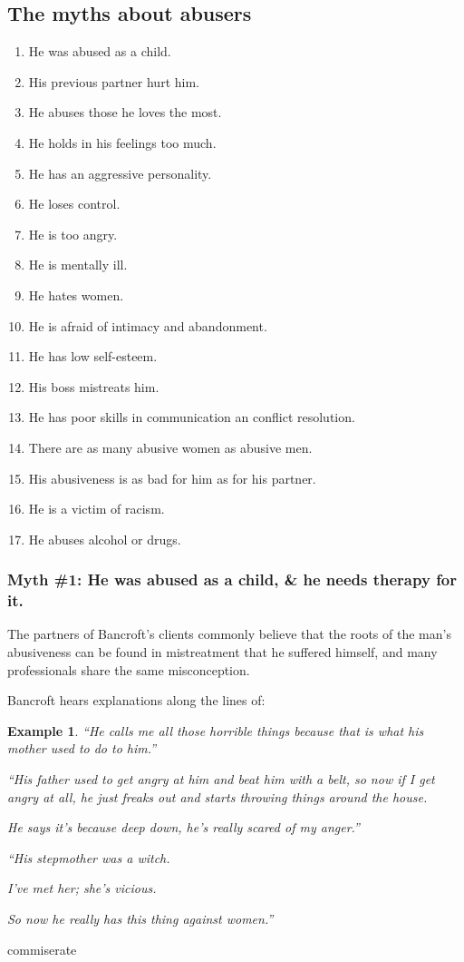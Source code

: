 \documentclass[oneside]{article}
\numberwithin{equation}{section}
\newtheorem{example}{Example}[section]
\begin{document}
\subsection{The myths about abusers}
\begin{enumerate}
    \item He was abused as a child.
    \item His previous partner hurt him.
    \item He abuses those he loves the most.
    \item He holds in his feelings too much.
    \item He has an aggressive personality.
    \item He loses control.
    \item He is too angry.
    \item He is mentally ill.
    \item He hates women.
    \item He is afraid of intimacy and abandonment.
    \item He has low self-esteem.
    \item His boss mistreats him.
    \item He has poor skills in communication an conflict resolution.
    \item There are as many abusive women as abusive men.
    \item His abusiveness is as bad for him as for his partner.
    \item He is a victim of racism.
    \item He abuses alcohol or drugs.
\end{enumerate}

\subsubsection{Myth \#1: He was abused as a child, \& he needs therapy for it.}
The partners of Bancroft's clients commonly believe that the roots of the man's abusiveness can be found in mistreatment that he suffered himself, and many professionals share the same misconception.

Bancroft hears explanations along the lines of:
\begin{example}
    ``He calls me all those horrible things because that is what his mother used to do to him.''
    
    ``His father used to get angry at him and beat him with a belt, so now if I get angry at all, he just freaks out and starts throwing things around the house.
    
    He says it's because deep down, he's really scared of my anger.''
    
    ``His stepmother was a witch.
    
    I've met her; she's vicious.
    
    So now he really has this thing against women.''
\end{example}commiserate
\end{document}
